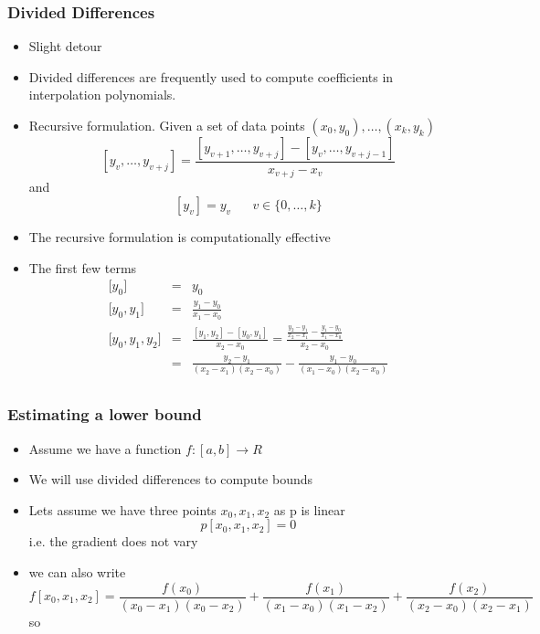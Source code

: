 \documentclass[10pt]{beamer}
\begin{document}
\begin{frame}
  \frametitle{Divided Differences}
  \begin{itemize}
  \item Slight detour
  \item Divided differences are frequently used to compute coefficients in interpolation polynomials. 
  \item Recursive formulation. Given a set of data points $(x_0, y_0),\ldots,(x_k,y_k)$
    \[
      [y_v, \ldots, y_{v+j}] = \frac{[y_{v+1}, \ldots, y_{v+j}] - [y_v,\ldots,y_{v+j-1}]}{x_{v+j} - x_v}
    \] and
    \[ [y_v] = y_v \mbox{ ~~~ } v \in \{0, \ldots, k\} \]
  \item The recursive formulation is computationally effective
  \item The first few terms
    \[
      \begin{array}{rcl}
        \mbox{[} y_0 ]           & = & y_0\\ 
        \mbox{[} y_0, y_1 ]      & = & \frac{y_1 - y_0}{x_1 - x_0}\\
        \mbox{[} y_0, y_1, y_2 ] & = & \frac{[ y_1,y_2 ] - [ y_0,y_1 ]}{x_2 - x_0}
                              = \frac{\frac{y_2-y_1}{x_2-x_1} - \frac{y_1-y_0}{x_1-x_0}}{x_2 - x_0}\\
                        & = & \frac{y_2 - y_1}{(x_2-x_1)(x_2-x_0)} - \frac{y_1 - y_0}{(x_1-x_0)(x_2-x_0)}\\
      \end{array}
    \]
  \end{itemize}
\end{frame}

\begin{frame}
  \frametitle{Estimating a lower bound}
  \begin{itemize}
  \item Assume we have a function $f:[a,b] \rightarrow R$
  \item We will use divided differences to compute bounds
  \item Lets assume we have three points $x_0, x_1, x_2$ as p is linear
    \[
      p[x_0, x_1, x_2] = 0
    \] i.e. the gradient does not vary
  \item we can also write
    \[
      f[x_0, x_1, x_2] = \frac{f(x_0)}{(x_0-x_1)(x_0-x_2)}+
      \frac{f(x_1)}{(x_1-x_0)(x_1-x_2)}+
      \frac{f(x_2)}{(x_2-x_0)(x_2-x_1)}
    \] so 
  \end{itemize}
\end{frame}
\end{document}

